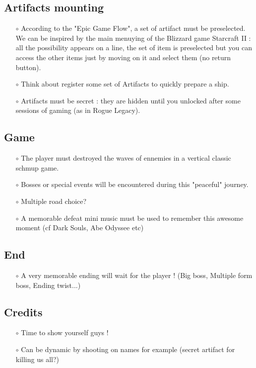 \documentclass[12pt,a4paper]{article}
\begin{document}
    \subsection{Artifacts mounting}
        \begin{itemize}
            \item[$\circ$] According to the "Epic Game Flow", a set of artifact must be preselected. We can be inspired by the main menuying of the Blizzard game Starcraft II : all the possibility appears on a line, the set of item is preselected but you can access the other items just by moving on it and select them (no return button).
            \item[$\circ$] Think about register some set of Artifacts to quickly prepare a ship.
            \item[$\circ$] Artifacts must be secret : they are hidden until you unlocked after some sessions of gaming (as in Rogue Legacy).
        \end{itemize}
        
    \subsection{Game}\label{sec:game}
        \begin{itemize}
            \item[$\circ$] The player must destroyed the waves of ennemies in a vertical classic schmup game.
            \item[$\circ$] Bosses or special events will be encountered during this "peaceful" journey.
            \item[$\circ$] Multiple road choice?
            \item[$\circ$] A memorable defeat mini music must be used to remember this awesome moment (cf Dark Souls, Abe Odyssee etc)
        \end{itemize}

    \subsection{End}
        \begin{itemize}
            \item[$\circ$] A very memorable ending will wait for the player ! (Big boss, Multiple form boss, Ending twist...)
        \end{itemize}
    \subsection{Credits}
        \begin{itemize}
            \item[$\circ$] Time to show yourself guys !
            \item[$\circ$] Can be dynamic by shooting on names for example (secret artifact for killing us all?)
        \end{itemize}
    
\end{document}
